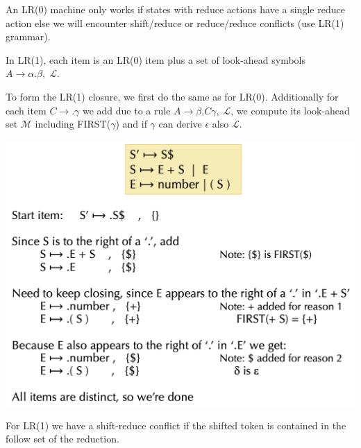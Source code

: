 An LR(0) machine only works if states with reduce actions have a single reduce action else we will encounter shift/reduce or reduce/reduce conflicts (use LR(1) grammar). \medskip

In LR(1), each item is an LR(0) item plus a set of look-ahead symbols $A \to \alpha . \beta, \; \mathcal L$.\medskip

To form the LR(1) closure, we first do the same as for LR(0). Additionally for each item $C \to . \gamma$ we add due to a rule $A \to \beta . C \gamma, \; \mathcal L$, we compute its look-ahead set $\mathcal M$ including FIRST($\gamma$) and if $\gamma$ can derive $\epsilon$ also $\mathcal L$. \medskip

\begin{center}
	\includegraphics[width=0.9\linewidth]{assets/lr1.png}
\end{center}
		
For LR(1) we have a shift-reduce conflict if the shifted token is contained in the follow set of the reduction.



